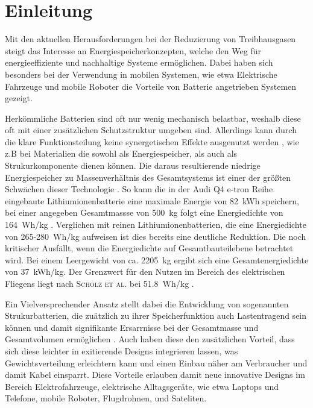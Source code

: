 \chapter[Einleitung]{\label{sec:Einleitung}Einleitung}
Mit den aktuellen Herausforderungen bei der Reduzierung von Treibhausgasen steigt das Interesse an Energiespeicherkonzepten, welche den Weg für energieeffiziente und nachhaltige Systeme ermöglichen. Dabei haben sich besonders bei der Verwendung in mobilen Systemen, wie etwa Elektrische Fahrzeuge \cite{Huo2015, Donateo2015,Jochem2015,Kim2014,Orsi2016,Silva2011,Holdway2010,Sternberg2015,Ramachandran2015} und mobile Roboter \cite{Hecht2023,Mikolajczyk2023,Ghobadpour2023,Wang2020} die Vorteile von Batterie angetrieben Systemen gezeigt.

Herkömmliche Batterien sind oft nur wenig mechanisch belastbar, weshalb diese oft mit einer zusätzlichen Schutzstruktur umgeben sind. Allerdings kann durch die klare Funktionsteilung keine synergetischen Effekte ausgenutzt werden , wie z.B bei Materialien die sowohl als Energiespeicher, als auch als Strukurkomponente dienen können. Die daraus resultierende niedrige Energiespeicher zu Massenverhältnis des Gesamtsystems ist einer der größten Schwächen dieser Technologie \cite{Armand2020,Schaefer2018, Cano2018,Goodenough2009}. 
So kann die in der Audi Q4 e-tron Reihe eingebaute Lithiumionenbatterie eine maximale Energie von 82~kWh speichern, bei einer angegeben Gesamtmassse von 500~kg folgt eine Energiedichte von 164~Wh/kg \cite{Radu2021,Audi2022}. Verglichen mit reinen Lithiumionenbatterien, die eine Energiedichte von 265-280~Wh/kg \cite{Armand2020} aufweisen ist dies bereits eine deutliche Reduktion. Die noch kritischer Ausfällt, wenn die Energiedichte auf Gesamtbauteilebene betrachtet wird. Bei einem Leergewicht von ca. 2205~kg \cite{Audi2022} ergibt sich eine Gesamtenergiedichte von 37~kWh/kg. Der Grenzwert für den Nutzen im Bereich des elektrischen Fliegens liegt nach \textsc{Scholz et al.} bei 51.8~Wh/kg \cite{Scholz2018}.

Ein Vielversprechender Ansatz stellt dabei die Entwicklung von sogenannten Strukurbatterien, die zuätzlich zu ihrer Speicherfunktion auch Lastentragend sein können \cite{Johannisson2018, Danzi2021, Wetzel2004, Thomas2004, Liu2009, Ekstedt2010, Wang2019, Asp2019, Moyer2020, Zhao2020, Yin2020, Wang2020, Lutkenhaus2020, Fu2021, Jin2021, Kalnaus2021, Wong2007, Carlson2013, Xu2022} und damit signifikante Ersarrnisse bei der Gesamtmasse und Gesamtvolumen ermöglichen \cite{Wetzel2004, Snyder2015, Carlstedt2020a, Asp2014, Johannisson2019}. Auch haben diese den zusätzlichen Vorteil, dass sich diese leichter in exitierende Designs integrieren lassen, was Gewichtsverteilung erleichtern kann und einen Einbau näher am Verbraucher und damit Kabel einsparrt. Diese Vorteile erlauben damit neue innovative Designs im Bereich Elektrofahrzeuge, elektrische Alltagsgeräte, wie etwa Laptops und Telefone, mobile Roboter, Flugdrohnen, und Sateliten.

